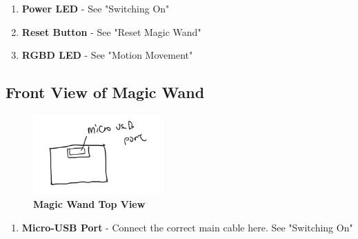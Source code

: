 \begin{enumerate}
	\item \textbf{Power LED} - See "Switching On"
	\item \textbf{Reset Button} - See "Reset Magic Wand"
	\item \textbf{RGBD LED} - See "Motion Movement"
\end{enumerate}


\bigskip


\subsection{Front View of Magic Wand}

\begin{figure}[h!]
	\centering
	\includegraphics[width=5cm]{Images/MagicWandFrontView.jpeg}
	\caption{\textbf{Magic Wand Top View}}
	\label{fig:Magic Wand Front View}
\end{figure}

\begin{enumerate}
	\item \textbf{Micro-USB Port} - Connect the correct main cable here. See "Switching On" 
\end{enumerate}

